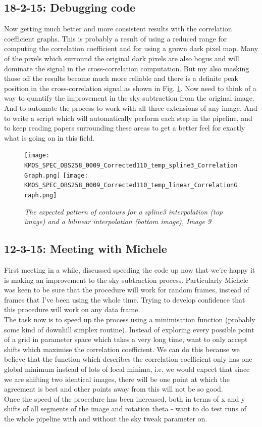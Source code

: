 \documentclass{literature}
\begin{document}
\subsection{18-2-15: Debugging code}
Now getting much better and more consistent results with the correlation coefficient graphs. This is probably a result of using a reduced range for computing the correlation coefficient and for using a grown dark pixel map. Many of the pixels which surround the original dark pixels are also bogus and will dominate the signal in the cross-correlation computation. But my also masking those off the results become much more reliable and there is a definite peak position in the cross-correlation signal as shown in Fig. \ref{fig:rho_plot_better}. Now need to think of a way to quantify the improvement in the sky subtraction from the original image. And to automate the process to work with all three extensions of any image. And to write a script which will automatically perform each step in the pipeline, and to keep reading papers surrounding these areas to get a better feel for exactly what is going on in this field.

\begin{figure}[!htp]
\centering
\texttt{[image: KMOS\_SPEC\_OBS258\_0009\_Corrected110\_temp\_spline3\_CorrelationGraph.png]}
\texttt{[image: KMOS\_SPEC\_OBS258\_0009\_Corrected110\_temp\_linear\_CorrelationGraph.png]}
\caption{\footnotesize{\emph{The expected pattern of contours for a spline3 interpolation (top image) and a bilinear interpolation (bottom image), Image 9}}}
\label{fig:rho_plot_better}
\end{figure} 

\subsection{12-3-15: Meeting with Michele}
First meeting in a while, discussed speeding the code up now that we're happy it is making an improvement to the sky subtraction process. Particularly Michele was keen to be sure that the procedure will work for random frames, instead of frames that I've been using the whole time. Trying to develop confidence that this procedure will work on any data frame. \\ 
The task now is to speed up the process using a minimisation function (probably some kind of downhill simplex routine). Instead of exploring every possible point of a grid in parameter space which takes a very long time, want to only accept shifts which maximise the correlation coefficient. We can do this because we believe that the function which describes the correlation coefficient only has one global minimum instead of lots of local minima, i.e. we would expect that since we are shifting two identical images, there will be one point at which the agreement is best and other points away from this will not be so good.  \\ 
Once the speed of the procedure has been increased, both in terms of x and y shifts of all segments of the image and rotation theta - want to do test runs of the whole pipeline with and without the sky tweak parameter on.   
\end{document}
